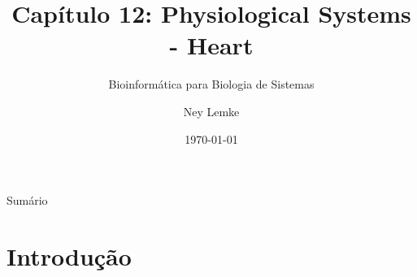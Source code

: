 


\usepackage{chemfig}
\usetikzlibrary{decorations.pathmorphing}

\title[Cap. 12: Heart Physiology]{Capítulo 12: Physiological Systems - Heart}
\subtitle{Bioinformática para Biologia de Sistemas}
\author{Ney Lemke}
\date{\today}



\begin{frame}
\titlepage
\end{frame}

\begin{frame}{Sumário}
\tableofcontents
\end{frame}

\section{Introdução}

